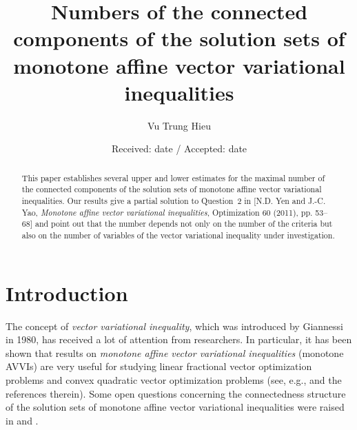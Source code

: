 \documentclass[smallextended,envcountsect]{svjour3}       %
\begin{document}
\title{Numbers of the connected components of the solution sets of monotone affine vector variational inequalities}

\author{Vu Trung Hieu}


\date{Received: date / Accepted: date}

\maketitle

\begin{abstract} This paper establishes several upper and lower estimates for the maximal number of the connected components of the solution sets of monotone affine vector variational inequalities. Our results give a partial solution to Question~2 in [N.D. Yen and J.-C. Yao, \textit{Monotone affine vector variational inequalities}, Optimization 60 (2011), pp. 53--68] and point out that the number depends not only on the number of the criteria but also on the number of variables of the vector variational inequality under investigation.
\end{abstract}

\section{Introduction}
The concept of \textit{vector variational inequality}, which was introduced by Giannessi \cite{G80} in 1980, has received a lot of attention from researchers. In particular, it has been shown that results on \textit{monotone affine vector variational inequalities} (monotone AVVIs) are very useful for studying linear fractional vector optimization problems and convex quadratic vector optimization problems (see, e.g., \cite{YY2011,Yen2012} and the references therein). Some open questions concerning the connectedness structure of the solution sets of monotone affine vector variational inequalities were raised in \cite{YY2011} and \cite{Yen2016}. 
\end{document}
